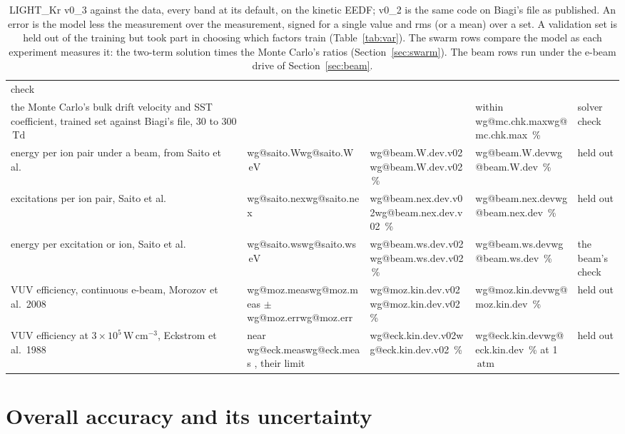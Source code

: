 \documentclass[11pt]{article}
\makeatletter
\newcommand\wg[1]{\ifcsname wg@#1\endcsname\csname wg@#1\endcsname
  \else\errmessage{no overview number '#1'. Rerun make_overview_v0_3.py}\fi}
\newcommand{\unit}[1]{\ensuremath{\,\mathrm{#1}}}
\makeatother
\begin{document}
\begin{table}[H]
\begin{tabularx}{\linewidth}{@{}>{\raggedright\arraybackslash}X
  >{\raggedright\arraybackslash}p{2.0cm}>{\raggedright\arraybackslash}p{2.0cm}
  >{\raggedright\arraybackslash}p{2.0cm}>{\raggedright\arraybackslash}p{1.8cm}@{}}
  check\\
the Monte Carlo's bulk drift velocity and SST coefficient, trained set
  against Biagi's file, 30 to 300\unit{Td} & & & within
  \wg{mc.chk.max}\,\% & solver check\\
\midrule
energy per ion pair under a beam, from Saito et al.~\cite{saito03} &
  \wg{saito.W}\unit{eV} & \wg{beam.W.dev.v02}\,\% & \wg{beam.W.dev}\,\% &
  held out\\
excitations per ion pair, Saito et al.~\cite{saito03} & \wg{saito.nex} &
  \wg{beam.nex.dev.v02}\,\% & \wg{beam.nex.dev}\,\% & held out\\
energy per excitation or ion, Saito et al.~\cite{saito03} &
  \wg{saito.ws}\unit{eV} & \wg{beam.ws.dev.v02}\,\% & \wg{beam.ws.dev}\,\% &
  the beam's check\\
VUV efficiency, continuous e-beam, Morozov et al.\ 2008~\cite{morozov08}
  & \wg{moz.meas} $\pm$ \wg{moz.err} & \wg{moz.kin.dev.v02}\,\% & \wg{moz.kin.dev}\,\% & held out\\
VUV efficiency at $3\times10^5\unit{W\,cm^{-3}}$, Eckstrom et al.\
  1988~\cite{eckstrom88} & near \wg{eck.meas}, their limit & \wg{eck.kin.dev.v02}\,\% & \wg{eck.kin.dev}\,\%
  at 1\unit{atm} & held out\\
\bottomrule
\end{tabularx}
\caption{LIGHT\_Kr v0\_3 against the data, every band at its default, on
the kinetic EEDF; v0\_2 is the same code on Biagi's file as published. An
error is the model less the measurement over the measurement, signed for
a single value and rms (or a mean) over a set. A validation set is held
out of the training but took part in choosing which factors train
(Table~\ref{tab:var}). The swarm rows compare the
model as each experiment measures it: the two-term solution times the
Monte Carlo's ratios (Section~\ref{sec:swarm}). The beam rows run under
the e-beam drive of Section~\ref{sec:beam}.}
\label{tab:score}
\end{table}

\section{Overall accuracy and its uncertainty}
\label{sec:accuracy}
\end{document}

